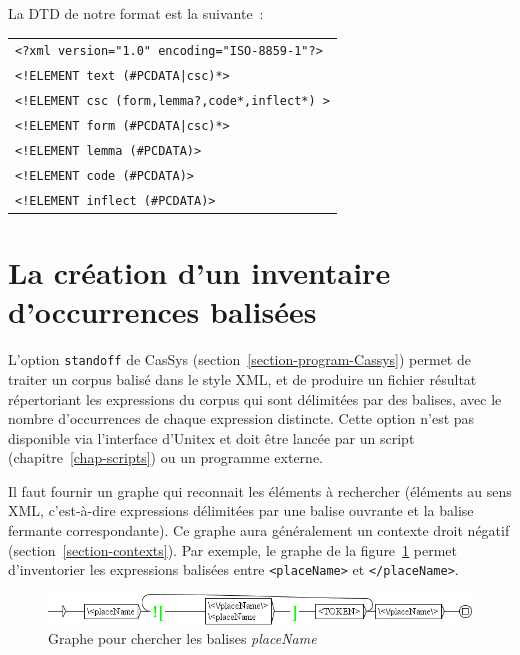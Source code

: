 La DTD de notre format est la suivante~:

\begin{tabular}{l}
\texttt{<?xml version="1.0" encoding="ISO-8859-1"?>}\\
\texttt{<!ELEMENT text (\#PCDATA|csc)*>}\\
\texttt{<!ELEMENT csc (form,lemma?,code*,inflect*) >}\\
\texttt{<!ELEMENT form (\#PCDATA|csc)*>}\\
\texttt{<!ELEMENT lemma (\#PCDATA)>}\\
\texttt{<!ELEMENT code (\#PCDATA)>}\\
\texttt{<!ELEMENT inflect (\#PCDATA)>}\\
\end{tabular}


\section{La création d'un inventaire d'occurrences balisées}
\label{section-standOff}

L'option \verb$standoff$ de CasSys (section~\ref{section-program-Cassys}) permet de traiter
un corpus balisé dans le style XML, et de produire un fichier résultat répertoriant les expressions du
corpus qui sont délimitées par des balises, avec le nombre d'occurrences de chaque expression distincte.
Cette option n'est pas disponible via l'interface d'Unitex et doit être lancée par un script
(chapitre~\ref{chap-scripts}) ou un programme externe.

\bigskip
\noindent Il faut fournir un graphe qui reconnait les éléments à rechercher (éléments au sens XML,
c'est-à-dire expressions délimitées par une balise ouvrante et la balise fermante correspondante).
Ce graphe aura généralement un contexte droit négatif (section~\ref{section-contexts}). 
Par exemple, le graphe de la figure~\ref{fig-placeNameStandoff} permet d'inventorier les expressions
balisées entre \verb$<placeName>$ et  \verb$</placeName>$.

\begin{figure}[!htb]
  \centering
  \includegraphics[width=15cm]{resources/img/placeNameStandoff.png}
  \caption{Graphe pour chercher les balises \emph{placeName}}
  \label{fig-placeNameStandoff}
\end{figure}

